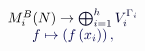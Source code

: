 \documentclass[12pt]{article}
\begin{document}
\makeatletter
\renewcommand*{\@textcolor}[3]{%
  \protect\leavevmode
  \begingroup
    \color#1{#2}#3%
  \endgroup
}
\makeatother
\begin{displaymath}
\begin{array}{c}
M_{i}^{B}(N) \mathcolor[RGB]{0,0,15}{\rightarrow} \mathcolor[RGB]{0,0,30}{\bigoplus_{i=1}^{h}} \mathcolor[RGB]{0,0,45}{V_{i}^{\Gamma_{i}}} \mathcolor[RGB]{0,0,60}{\\
f} \mathcolor[RGB]{0,0,75}{\mapsto\left(f\left(x_{i}\right)\right),
\end{array}}
\end{displaymath}
\end{document}
